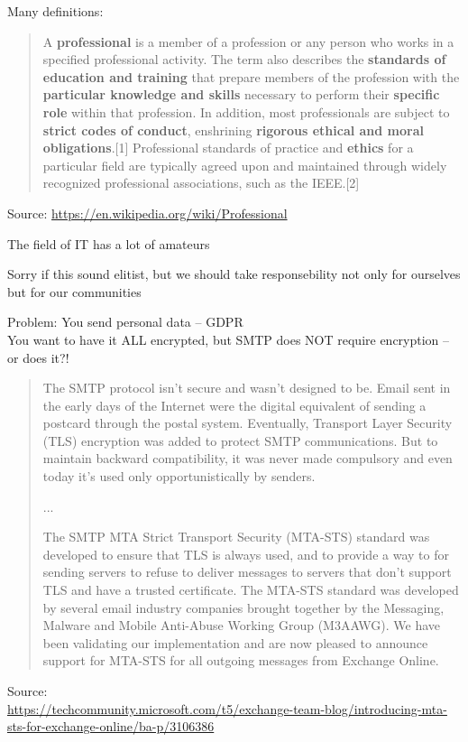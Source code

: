 \documentclass[Screen16to9,17pt]{foils}
\begin{document}
Many definitions:
\begin{quote}
A {\bf professional} is a member of a profession or any person who works in a specified professional activity. The term also describes the {\bf standards of education and training} that prepare members of the profession with the {\bf particular knowledge and skills} necessary to perform their {\bf specific role} within that profession. In addition, most professionals are subject to {\bf strict codes of conduct}, enshrining {\bf rigorous ethical and moral obligations}.[1] Professional standards of practice and {\bf ethics} for a particular field are typically agreed upon and maintained through widely recognized professional associations, such as the IEEE.[2]
\end{quote}
Source: \url{https://en.wikipedia.org/wiki/Professional}

\begin{list2}
\item The field of IT has a lot of amateurs
\item Sorry if this sound elitist, but we should take responsebility not only for ourselves but for our communities
\end{list2}


Problem: You send personal data -- GDPR\\
You want to have it ALL encrypted, but SMTP does NOT require encryption -- or does it?!

\vskip 1cm

\begin{quote}\footnotesize
The SMTP protocol isn’t secure and wasn’t designed to be. Email sent in the early days of the Internet were the digital equivalent of sending a postcard through the postal system. Eventually, Transport Layer Security (TLS) encryption was added to protect SMTP communications. But to maintain backward compatibility, it was never made compulsory and even today it’s used only opportunistically by senders.

...

The SMTP MTA Strict Transport Security (MTA-STS) standard was developed to ensure that TLS is always used, and to provide a way to for sending servers to refuse to deliver messages to servers that don’t support TLS and have a trusted certificate. The MTA-STS standard was developed by several email industry companies brought together by the Messaging, Malware and Mobile Anti-Abuse Working Group (M3AAWG). We have been validating our implementation and are now pleased to announce support for MTA-STS for all outgoing messages from Exchange Online.
\end{quote}
Source:\\
 {\scriptsize\url{https://techcommunity.microsoft.com/t5/exchange-team-blog/introducing-mta-sts-for-exchange-online/ba-p/3106386}}
\end{document}
